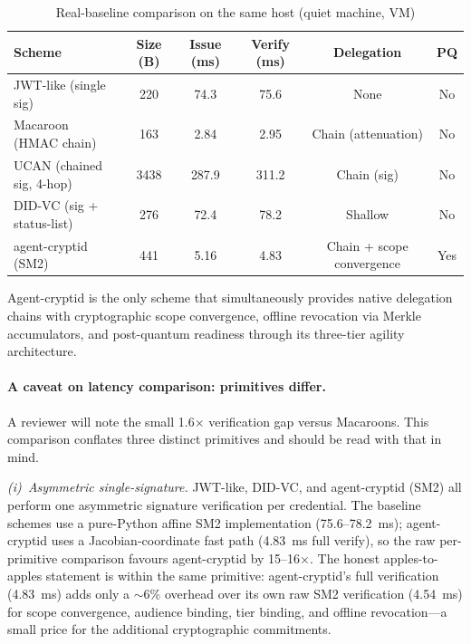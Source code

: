 \documentclass[10pt,twocolumn]{IEEEtran}
\begin{document}
\begin{table}[t]
  \caption{Real-baseline comparison on the same host (quiet machine, VM)}
  \label{tab:realbaseline}
  \centering\small\setlength{\tabcolsep}{4pt}
  \begin{tabular}{lccccc}
    \toprule
    \textbf{Scheme} & \textbf{Size (B)} & \textbf{Issue (ms)} & \textbf{Verify (ms)} & \textbf{Delegation} & \textbf{PQ} \\
    \midrule
    JWT-like (single sig) & 220 & 74.3 & 75.6 & None & No \\
    Macaroon (HMAC chain) & 163 & 2.84 & 2.95 & Chain (attenuation) & No \\
    UCAN (chained sig, 4-hop) & 3438 & 287.9 & 311.2 & Chain (sig) & No \\
    DID-VC (sig + status-list) & 276 & 72.4 & 78.2 & Shallow & No \\
    \midrule
    agent-cryptid (SM2) & 441 & 5.16 & 4.83 & Chain + scope convergence & Yes \\
    \bottomrule
  \end{tabular}
\end{table}

Agent-cryptid is the only scheme that simultaneously provides native
delegation chains with cryptographic scope convergence, offline
revocation via Merkle accumulators, and post-quantum readiness through
its three-tier agility architecture.

\paragraph{A caveat on latency comparison: primitives differ.}
A reviewer will note the small 1.6$\times$ verification gap versus
Macaroons. This comparison conflates three distinct primitives and
should be read with that in mind.

\emph{(i)~Asymmetric single-signature.} JWT-like, DID-VC, and
agent-cryptid (SM2) all perform one asymmetric signature verification
per credential. The baseline schemes use a pure-Python affine SM2
implementation (75.6--78.2~ms); agent-cryptid uses a Jacobian-coordinate
fast path (4.83~ms full verify), so the raw per-primitive comparison
favours agent-cryptid by 15--16$\times$. The honest apples-to-apples
statement is within the same primitive: agent-cryptid's full verification
(4.83~ms) adds only a $\sim$6\% overhead over its own raw SM2
verification (4.54~ms) for scope convergence, audience binding, tier
binding, and offline revocation---a small price for the additional
cryptographic commitments.
\end{document}
